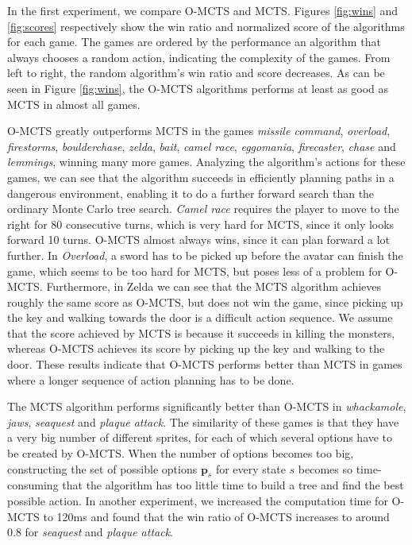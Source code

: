 In the first experiment, we compare O-MCTS and MCTS. Figures \ref{fig:wins} and
\ref{fig:scores} respectively show the win ratio and normalized score of the
algorithms for each game. The games are ordered by the performance an algorithm
that always chooses a random action, indicating the complexity of the games.
From left to right, the random algorithm's win ratio and score decreases. As can
be seen in Figure \ref{fig:wins}, the O-MCTS algorithms performs at least as
good as MCTS in almost all games. 

O-MCTS greatly outperforms MCTS in the games \textit{missile
command}, \textit{overload}, \textit{firestorms}, \textit{boulderchase},
\textit{zelda}, \textit{bait}, \textit{camel race}, \textit{eggomania},
\textit{firecaster}, \textit{chase} and \textit{lemmings}, winning many more
games. Analyzing the algorithm's actions for these games, we can see that
the algorithm succeeds in efficiently planning paths in a dangerous environment,
enabling it to do a further forward search than the ordinary Monte Carlo tree
search. \textit{Camel race} requires the player to move to the right for 80
consecutive turns, which is very hard for MCTS, since it only looks forward 10 
turns. O-MCTS almost always wins, since it can plan forward a lot further. In
\textit{Overload}, a sword has to be picked up before the avatar can finish the
game, which seems to be too hard for MCTS, but poses less of a problem for
O-MCTS.  Furthermore, in Zelda we can see that the MCTS algorithm achieves
roughly the same score as O-MCTS, but does not win the game, since picking up
the key and walking towards the door is a difficult action sequence. We assume
that the score achieved by MCTS is because it succeeds in killing the monsters,
whereas O-MCTS achieves its score by picking up the key and walking to the door.
These results indicate that O-MCTS performs better than MCTS in games where a
longer sequence of action planning has to be done.

The MCTS algorithm performs significantly better than O-MCTS in
\textit{whackamole}, \textit{jaws}, \textit{seaquest} and \textit{plaque
attack}. The similarity of these games is that they have a very big number of
different sprites, for each of which several options have to be created by
O-MCTS.  When the number of options becomes too big, constructing the set of
possible options $\mathbf{p}_s$ for every state $s$ becomes so time-consuming
that the algorithm has too little time to build a tree and find the best
possible action. In another experiment, we increased the computation time for
O-MCTS to 120ms and found that the win ratio of O-MCTS increases to around $0.8$
for \textit{seaquest} and \textit{plaque attack}.

